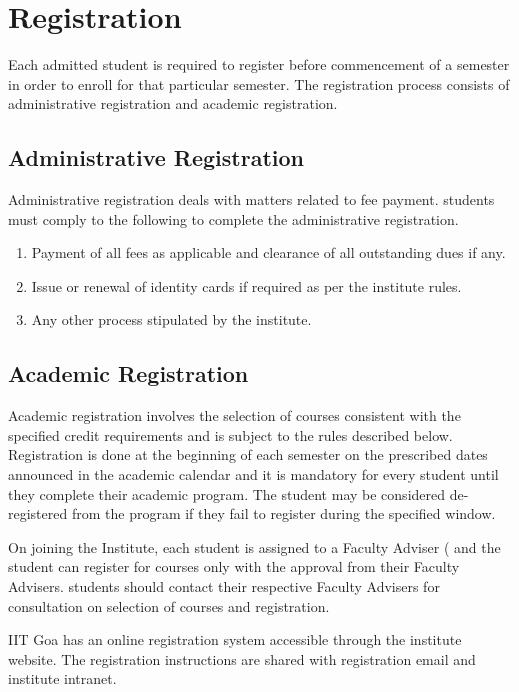 \section{Registration \label{lab:Registration} }

Each admitted \gls{student} is required to register before commencement of a semester in order to enroll for that particular semester. The registration process consists of administrative registration and academic registration.

\subsection{Administrative Registration}

Administrative registration deals with matters related to fee payment. \Glspl{student} must comply to the following to complete the administrative registration.

\begin{enumerate}[leftmargin=15mm]
    \item Payment of all fees as applicable and clearance of all outstanding dues if any.
    \item Issue or renewal of identity cards if required as per the institute rules.
    \item Any other process stipulated by the institute.
\end{enumerate}

\subsection{Academic Registration}

Academic registration involves the selection of courses consistent with the specified credit requirements and is subject to the rules described below. Registration is done at the beginning of each semester on the prescribed dates announced in the academic calendar and it is mandatory for every student until they complete their academic program. The \gls{student} may be considered de-registered from the program if they fail to register during the specified window.

On joining the Institute, each \gls{student} is assigned to a Faculty Adviser ( and the student can register for courses only with the approval from their Faculty Advisers. \Glspl{student} should contact their respective Faculty Advisers for consultation on selection of courses and registration.

IIT Goa has an online registration system accessible through the institute website. The registration instructions are shared with registration email and institute intranet.

